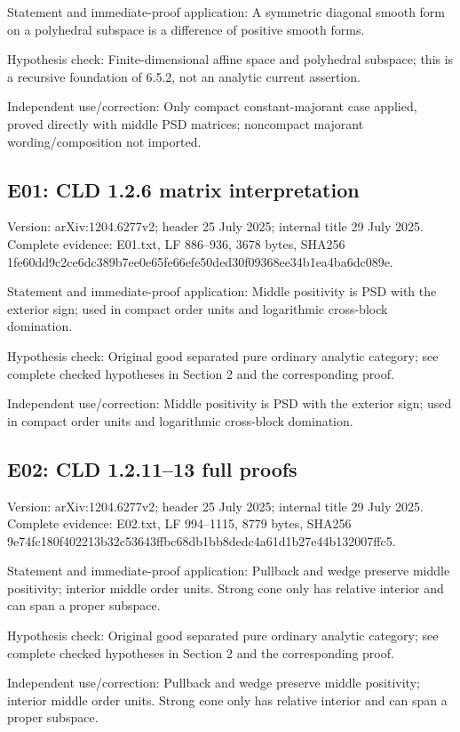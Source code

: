 \documentclass[11pt]{article}
\begin{document}
Statement and immediate-proof application: A symmetric diagonal smooth form on a polyhedral subspace is a difference of positive smooth forms.

Hypothesis check: Finite-dimensional affine space and polyhedral subspace; this is a recursive foundation of 6.5.2, not an analytic current assertion.

Independent use/correction: Only compact constant-majorant case applied, proved directly with middle PSD matrices; noncompact majorant wording/composition not imported.

\subsection{E01: CLD 1.2.6 matrix interpretation}

Version: arXiv:1204.6277v2; header 25 July 2025; internal title 29 July 2025. Complete evidence: E01.txt, LF 886--936, 3678 bytes, SHA256 1fe60dd9c2ce6dc389b7ee0e65fe66efe50ded30f09368ee34b1ea4ba6dc089e.

Statement and immediate-proof application: Middle positivity is PSD with the exterior sign; used in compact order units and logarithmic cross-block domination.

Hypothesis check: Original good separated pure ordinary analytic category; see complete checked hypotheses in Section 2 and the corresponding proof.

Independent use/correction: Middle positivity is PSD with the exterior sign; used in compact order units and logarithmic cross-block domination.

\subsection{E02: CLD 1.2.11--13 full proofs}

Version: arXiv:1204.6277v2; header 25 July 2025; internal title 29 July 2025. Complete evidence: E02.txt, LF 994--1115, 8779 bytes, SHA256 9e74fc180f402213b32c53643ffbc68db1bb8dedc4a61d1b27e44b132007ffc5.

Statement and immediate-proof application: Pullback and wedge preserve middle positivity; interior middle order units. Strong cone only has relative interior and can span a proper subspace.

Hypothesis check: Original good separated pure ordinary analytic category; see complete checked hypotheses in Section 2 and the corresponding proof.

Independent use/correction: Pullback and wedge preserve middle positivity; interior middle order units. Strong cone only has relative interior and can span a proper subspace.
\end{document}
